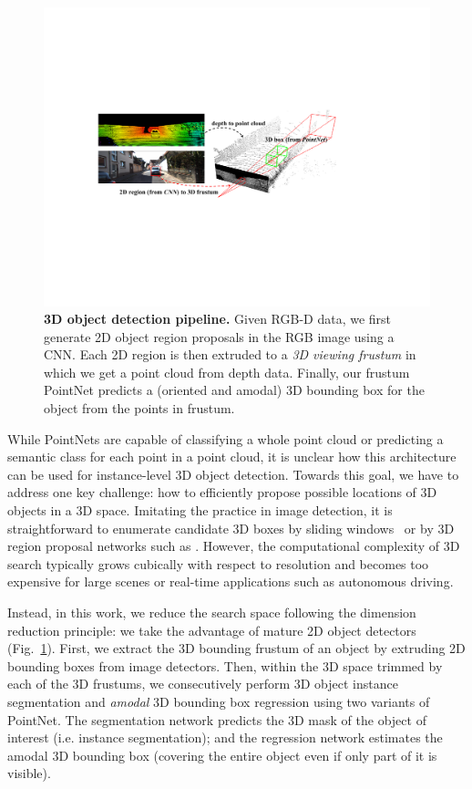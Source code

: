 \begin{figure}[t!]
    \centering
    \includegraphics[width=\linewidth]{fig/teaser.pdf}
    \caption{\textbf{3D object detection pipeline.} Given RGB-D data, we first generate 2D object region proposals in the RGB image using a CNN. Each 2D region is then extruded to a \emph{3D viewing frustum} in which we get a point cloud from depth data. Finally, our frustum PointNet predicts a (oriented and amodal) 3D bounding box for the object from the points in frustum.}
    \label{fig:teaser}
\end{figure}

While PointNets are capable of classifying a whole point cloud or predicting a semantic class for each point in a point cloud, it is unclear how this architecture can be used for instance-level 3D object detection. Towards this goal, we have to address one key challenge: how to efficiently propose possible locations of 3D objects in a 3D space. Imitating the practice in image detection, it is straightforward to enumerate candidate 3D boxes by sliding windows~\cite{engelcke2017vote3deep} or by 3D region proposal networks such as \cite{song2015sun}. However, the computational complexity of 3D search typically grows cubically with respect to resolution and becomes too expensive for large scenes or real-time applications such as autonomous driving. %

Instead, in this work, we reduce the search space following the dimension reduction principle: we take the advantage of mature 2D object detectors (Fig.~\ref{fig:teaser}). First, we extract the 3D bounding frustum of an object by extruding 2D bounding boxes from image detectors. Then, within the 3D space trimmed by each of the 3D frustums, we consecutively perform 3D object instance segmentation and \emph{amodal} 3D bounding box regression using two variants of PointNet. The segmentation network predicts the 3D mask of the object of interest (i.e. instance segmentation); and the regression network estimates the amodal 3D bounding box (covering the entire object even if only part of it is visible).

